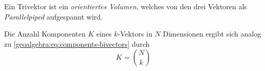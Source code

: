 {Ein Trivektor ist ein \emph{orientiertes Volumen}, welches von den drei Vektoren als \emph{Parallelpiped} aufgespannt wird.

Die Anzahl Komponenten $K$ eines $k$-Vektors in $N$ Dimensionen ergibt sich analog zu \eqref{geoalgebra:eq:components-bivectors} durch
\begin{equation}
  K = \binom{N}{k}
\end{equation}
}
